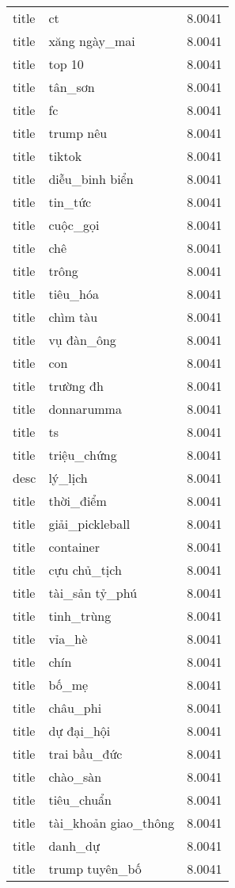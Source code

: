 \documentclass{article}
\begin{document}
\begin{tabular}{lll}
title & ct & 8.0041\\
title & xăng ngày\_mai & 8.0041\\
title & top 10 & 8.0041\\
title & tân\_sơn & 8.0041\\
title & fc & 8.0041\\
title & trump nêu & 8.0041\\
title & tiktok & 8.0041\\
title & diễu\_binh biển & 8.0041\\
title & tin\_tức & 8.0041\\
title & cuộc\_gọi & 8.0041\\
title & chê & 8.0041\\
title & trông & 8.0041\\
title & tiêu\_hóa & 8.0041\\
title & chìm tàu & 8.0041\\
title & vụ đàn\_ông & 8.0041\\
title & con & 8.0041\\
title & trường đh & 8.0041\\
title & donnarumma & 8.0041\\
title & ts & 8.0041\\
title & triệu\_chứng & 8.0041\\
desc & lý\_lịch & 8.0041\\
title & thời\_điểm & 8.0041\\
title & giải\_pickleball & 8.0041\\
title & container & 8.0041\\
title & cựu chủ\_tịch & 8.0041\\
title & tài\_sản tỷ\_phú & 8.0041\\
title & tinh\_trùng & 8.0041\\
title & vỉa\_hè & 8.0041\\
title & chín & 8.0041\\
title & bố\_mẹ & 8.0041\\
title & châu\_phi & 8.0041\\
title & dự đại\_hội & 8.0041\\
title & trai bầu\_đức & 8.0041\\
title & chào\_sàn & 8.0041\\
title & tiêu\_chuẩn & 8.0041\\
title & tài\_khoản giao\_thông & 8.0041\\
title & danh\_dự & 8.0041\\
title & trump tuyên\_bố & 8.0041\\

\end{tabular}
\end{document}

